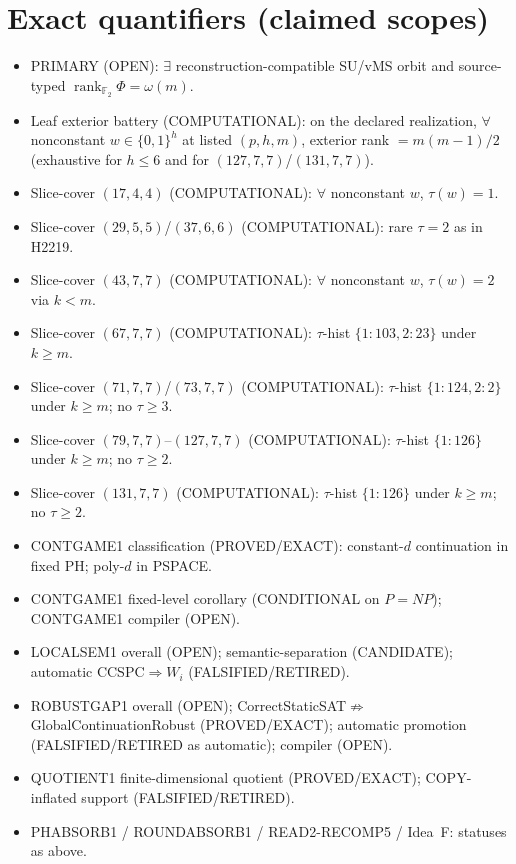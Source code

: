 \documentclass[11pt]{article}
\begin{document}
\section*{Exact quantifiers (claimed scopes)}
\begin{itemize}
\item PRIMARY (OPEN): $\exists$ reconstruction-compatible SU/vMS orbit and source-typed
  $\operatorname{rank}_{\mathbb F_2}\Phi=\omega(m)$.
\item Leaf exterior battery (COMPUTATIONAL): on the declared realization, $\forall$ nonconstant
  $w\in\{0,1\}^h$ at listed $(p,h,m)$, exterior rank $=m(m-1)/2$
  (exhaustive for $h\le6$ and for $(127,7,7)$/$(131,7,7)$).
\item Slice-cover $(17,4,4)$ (COMPUTATIONAL): $\forall$ nonconstant $w$, $\tau(w)=1$.
\item Slice-cover $(29,5,5)$/$(37,6,6)$ (COMPUTATIONAL): rare $\tau{=}2$ as in H2219.
\item Slice-cover $(43,7,7)$ (COMPUTATIONAL): $\forall$ nonconstant $w$, $\tau(w)=2$ via $k{<}m$.
\item Slice-cover $(67,7,7)$ (COMPUTATIONAL): $\tau$-hist $\{1{:}103,2{:}23\}$ under $k{\ge}m$.
\item Slice-cover $(71,7,7)$/$(73,7,7)$ (COMPUTATIONAL): $\tau$-hist $\{1{:}124,2{:}2\}$ under $k{\ge}m$;
  no $\tau{\ge}3$.
\item Slice-cover $(79,7,7)$--$(127,7,7)$ (COMPUTATIONAL): $\tau$-hist $\{1{:}126\}$ under $k{\ge}m$;
  no $\tau{\ge}2$.
\item Slice-cover $(131,7,7)$ (COMPUTATIONAL): $\tau$-hist $\{1{:}126\}$ under $k{\ge}m$;
  no $\tau{\ge}2$.
\item CONTGAME1 classification (PROVED/EXACT): constant-$d$ continuation in fixed PH;
  poly-$d$ in PSPACE.
\item CONTGAME1 fixed-level corollary (CONDITIONAL on $P=NP$); CONTGAME1 compiler (OPEN).
\item LOCALSEM1 overall (OPEN); semantic-separation (CANDIDATE); automatic CCSPC$\Rightarrow W_i$ (FALSIFIED/RETIRED).
\item ROBUSTGAP1 overall (OPEN); CorrectStaticSAT$\not\Rightarrow$GlobalContinuationRobust (PROVED/EXACT);
  automatic promotion (FALSIFIED/RETIRED as automatic); compiler (OPEN).
\item QUOTIENT1 finite-dimensional quotient (PROVED/EXACT); COPY-inflated support (FALSIFIED/RETIRED).
\item PHABSORB1 / ROUNDABSORB1 / READ2-RECOMP5 / Idea~F: statuses as above.
\end{itemize}
\end{document}
